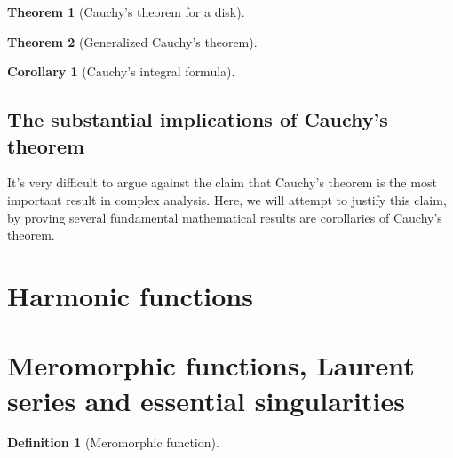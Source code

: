 \documentclass[aps,pra,showpacs,notitlepage,onecolumn,superscriptaddress,nofootinbib]{revtex4-1}
\theoremstyle{definition}
\newtheorem{definition}{Definition}[section]
\newtheorem{theorem}{Theorem}[section]
\newtheorem{corollary}{Corollary}[theorem]
\begin{document}
\begin{theorem}[Cauchy's theorem for a disk]
\end{theorem}

\begin{theorem}[Generalized Cauchy's theorem]
\end{theorem}

\begin{corollary}[Cauchy's integral formula]
  \end{corollary}

\subsection{The substantial implications of Cauchy's theorem}

\noindent It's very difficult to argue against the claim that Cauchy's theorem is the most important result in complex analysis. Here, we will attempt to justify this claim,
by proving several fundamental mathematical results are corollaries of Cauchy's theorem.

\section{Harmonic functions}


\section{Meromorphic functions, Laurent series and essential singularities}

\begin{definition}[Meromorphic function]
  \end{definition}
\end{document}
